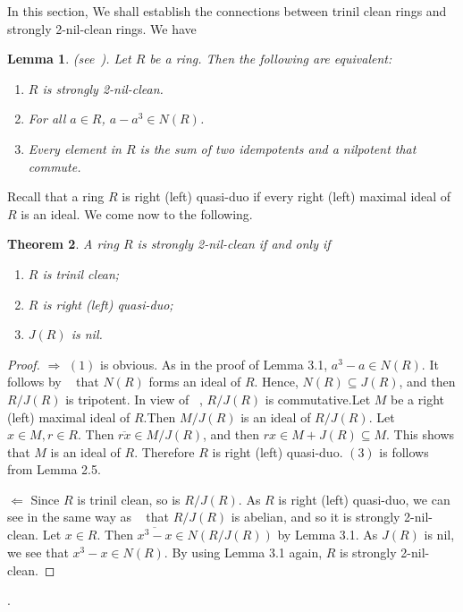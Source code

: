 \documentclass[12pt, reqno]{amsart}
\newtheorem{thm}{Theorem}[section]
\newtheorem{lem}[thm]{Lemma}
\numberwithin{equation}{section}
\begin{document}
In this section, We shall establish the connections between trinil clean rings and strongly 2-nil-clean rings. We have

\begin{lem} (see~\cite[Theorem 2.8]{CS}). Let $R$
be a ring. Then the following are equivalent:
\end{lem}
\begin{enumerate}
\item [(1)] {\it $R$ is strongly 2-nil-clean.}
\vspace{-.5mm}
\item [(2)] {\it For all $a\in R$, $a-a^3\in N(R)$.}
\vspace{-.5mm}
\item [(3)] {\it Every element in $R$ is the sum of two idempotents and a nilpotent that commute.}
\end{enumerate}

Recall that a ring $R$ is right (left) quasi-duo if every right (left) maximal ideal of $R$ is an ideal. We come now to the following.

\begin{thm} A ring $R$ is strongly 2-nil-clean if and only if
\end{thm}
\begin{enumerate}
\item [(1)]{\it $R$ is trinil clean;}
\vspace{-.5mm}
\item [(2)]{\it $R$ is right (left) quasi-duo;}
\vspace{-.5mm}
\item [(3)]{\it $J(R)$ is nil.}
\end{enumerate}
\begin{proof} $\Longrightarrow$ $(1)$ is obvious. As in the proof of Lemma 3.1, $a^3-a\in N(R)$. It follows by ~\cite[Theorem A1]{HT1} that $N(R)$ forms an ideal of $R$.
Hence, $N(R)\subseteq J(R)$, and then $R/J(R)$ is tripotent. In view of ~\cite[Theorem 1]{HT}, $R/J(R)$ is commutative.Let $M$ be a right (left) maximal ideal of $R$.Then $M/J(R)$ is an ideal of $R/J(R)$. Let $x\in M, r\in R$. Then $\overline{rx}\in M/J(R)$, and then $rx\in M+J(R)\subseteq M$. This shows that $M$ is an ideal of $R$. Therefore $R$ is right (left) quasi-duo. $(3)$ is follows from Lemma 2.5.

$\Longleftarrow$ Since $R$ is trinil clean, so is $R/J(R)$. As $R$ is right (left) quasi-duo, we can see in the same way as ~\cite[Theorem 2.8]{CH} that $R/J(R)$ is abelian, and so it is strongly 2-nil-clean. Let $x\in R$. Then $\overline{x^3-x}\in N(R/J(R))$  by Lemma 3.1. As $J(R)$ is nil, we see that $x^3-x\in N(R)$. By using Lemma 3.1 again, $R$ is strongly 2-nil-clean.\end{proof}.
\end{document}
